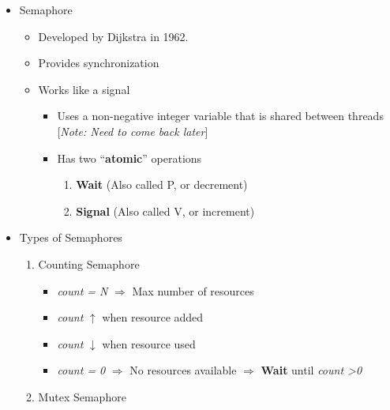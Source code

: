 \documentclass[12pt]{article}
\begin{document}
\begin{itemize}
    \item Semaphore
    \begin{itemize}
        \item Developed by Dijkstra in 1962.
        \item Provides synchronization
        \item Works like a signal
        \begin{itemize}
            \item Uses a non-negative integer variable that is shared between threads
            [\textit{Note: Need to come back later}]
            \item Has two ``\textbf{atomic}'' operations
            \begin{enumerate}[1.]
                \item \textbf{Wait} (Also called P, or decrement)
                \item \textbf{Signal} (Also called V, or increment)
            \end{enumerate}
        \end{itemize}
    \end{itemize}

    \item Types of Semaphores
    \begin{enumerate}[1.]
        \item Counting Semaphore
        \begin{itemize}
            \item \textit{count = N} $\Rightarrow$ Max number of resources
            \item \textit{count} $\uparrow$ when resource added
            \item \textit{count} $\downarrow$ when resource used
            \item \textit{count = 0} $\Rightarrow$ No resources available $\Rightarrow$ \textbf{Wait} until \textit{count \textgreater 0}
        \end{itemize}
        \item Mutex Semaphore
    \end{enumerate}
\end{itemize}

\bigskip
\end{document}
